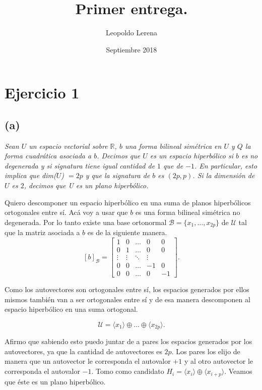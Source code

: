


\newcommand{\norm}[1]{\left\lVert#1\right\rVert}
\newcommand{\ti}{\tilde}

\title{Primer entrega.}
\author{Leopoldo Lerena }
\date{Septiembre 2018}



\maketitle

\section*{Ejercicio 1}
\subsection*{(a)}
\textit{Sean $U$ un espacio vectorial sobre $\mathbb R$, $b$ una forma bilineal sim\'etrica en $U$ y $Q$ la forma
cuadr\'atica asociada a $b$. Decimos que $U$ es un espacio hiperb\'olico si $b$ es no degenerada
y si signatura tiene igual cantidad de $1$ que de $-1$. En particular, esto implica que
dim($U$) $= 2p$ y que la signatura de $b$ es $(2p, p)$. Si la dimensi\'on de $U$ es $2$, decimos que U es un plano hiperbólico.}


\bigskip

Quiero descomponer un espacio hiperbólico en una suma de planos hiperbólicos ortogonales entre sí. Acá voy a usar que $b$ es una forma bilineal simétrica  no degenerada. Por lo tanto  existe una base ortonormal $\mathcal{B} = \{ x_1, \dots, x_{2p}\}$ de $\mathcal U$ tal que  la matriz asociada a $b$  es de la siguiente manera.
\[
[b]_{\mathcal{B}}
=
\begin{bmatrix}
1 & 0  & \dots & 0 & 0 \\
0 & 1  & \dots & 0 & 0 \\
\vdots & \vdots  & \ddots & \vdots \\
0 & 0  & \dots & -1 & 0 \\
0 & 0  & \dots & 0 & -1
\end{bmatrix}
.\]

Como los autovectores son ortogonales entre sí, los espacios generados por ellos mismos también van a ser ortogonales entre sí y de esa manera descomponen al espacio hiperbólico en una suma ortogonal.

\[ \mathcal{U} = \langle x_1 \rangle \oplus \dots \oplus \langle x_{2p} \rangle .\]

 Afirmo que sabiendo esto puedo juntar de a pares los espacios generados por los autovectores, ya que la cantidad de autovectores es $2p$. Los pares los elijo de manera que un autovector le corresponda el autovalor $+1$ y al otro autovector le corresponda el autovalor $-1$. Tomo como candidato $H_{i} = \langle x_i \rangle \oplus \langle x_{i+p} \rangle $. Veamos que éste es un plano hiperbólico. 
 
